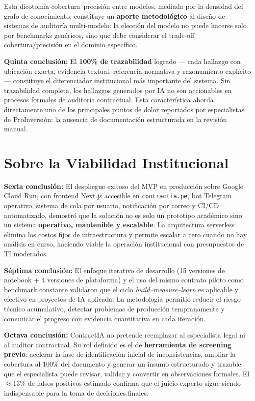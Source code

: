 Esta dicotomía cobertura--precisión entre modelos, mediada por la densidad
del grafo de conocimiento, constituye un \textbf{aporte metodológico} al
diseño de sistemas de auditoría multi-modelo: la elección del modelo no
puede hacerse solo por benchmarks genéricos, sino que debe considerar el
trade-off cobertura/precisión en el dominio específico.

\textbf{Quinta conclusión:}
El \textbf{100\% de trazabilidad} logrado --- cada hallazgo con ubicación
exacta, evidencia textual, referencia normativa y razonamiento explícito ---
constituye el diferenciador institucional más importante del sistema.
Sin trazabilidad completa, los hallazgos generados por IA no son accionables
en procesos formales de auditoría contractual. Esta característica aborda
directamente uno de los principales puntos de dolor reportados por
especialistas de ProInversión: la ausencia de documentación estructurada
en la revisión manual.

\section*{Sobre la Viabilidad Institucional}

\textbf{Sexta conclusión:}
El despliegue exitoso del MVP en producción sobre Google Cloud Run, con
frontend Next.js accesible en \texttt{contractia.pe}, bot Telegram operativo,
sistema de cola por usuario, notificación por correo y CI/CD automatizado,
demostró que la solución no es solo un prototipo académico sino un sistema
\textbf{operativo, mantenible y escalable}. La arquitectura serverless
elimina los costos fijos de infraestructura y permite escalar a cero cuando
no hay análisis en curso, haciendo viable la operación institucional con
presupuestos de TI moderados.

\textbf{Séptima conclusión:}
El enfoque iterativo de desarrollo (15 versiones de notebook + 4 versiones
de plataforma) y el uso del mismo contrato piloto como benchmark constante
validaron que el ciclo \textit{build--measure--learn} es aplicable y efectivo
en proyectos de IA aplicada. La metodología permitió reducir el riesgo técnico
acumulativo, detectar problemas de producción tempranamente y comunicar
el progreso con evidencia cuantitativa en cada iteración.

\textbf{Octava conclusión:}
ContractIA no pretende reemplazar al especialista legal ni al auditor
contractual. Su rol definido es el de \textbf{herramienta de screening
previo}: acelerar la fase de identificación inicial de inconsistencias,
ampliar la cobertura al 100\% del documento y generar un insumo estructurado
y trazable que el especialista puede revisar, validar y convertir en
observaciones formales. El $\approx 13\%$ de falsos positivos estimado
confirma que el juicio experto sigue siendo indispensable para la toma de
decisiones finales.

